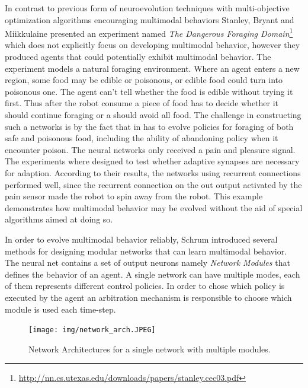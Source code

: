 \documentclass[format=acmsmall, review=false, screen=true]{acmart}
\begin{document}
In contrast to previous form of neuroevolution techniques with multi-objective optimization algorithms encouraging multimodal behaviors Stanley, Bryant and Miikkulaine presented an experiment named \emph{The Dangerous Foraging Domain}\footnote{\url{http://nn.cs.utexas.edu/downloads/papers/stanley.cec03.pdf}} which does not explicitly focus on developing multimodal behavior, however they produced agents that could potentially exhibit multimodal behavior. The experiment models a natural foraging environment. Where an agent enters a new region, some food may be edible or poisonous, or edible food could turn into poisonous one. The agent can't tell whether the food is edible without trying it first. Thus after the robot consume a piece of food has to decide whether it should continue foraging or a should avoid all food. The challenge in constructing such a networks is by the fact that in has to evolve policies for foraging of both safe and poisonous food, including the ability of abandoning policy when it encounter poison. The neural networks only received a pain and pleasure signal. The experiments where designed to test whether adaptive synapses are necessary for adaption. According to their results, the networks using recurrent connections performed well, since the recurrent connection on the out output activated by the pain sensor made the robot to spin away from the robot. This example demonstrates how multimodal behavior may be evolved without the aid of special algorithms aimed at doing so.

In order to evolve multimodal behavior reliably, Schrum introduced several methods for designing modular networks that can learn multimodal behavior. The neural net contains a set of output neurons namely \emph{Network Modules} that defines the behavior of an agent. A single network can have multiple modes, each of them represents different control policies. In order to chose which policy is executed by the agent an arbitration mechanism is responsible to choose which module is used each time-step.

\begin{figure}[H]
  \texttt{[image: img/network\_arch.JPEG]}
  \caption{\label{fig:paretofront}Network Architectures for a single network with multiple modules.}
\end{figure}
\end{document}
